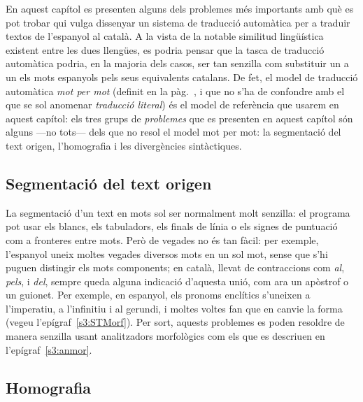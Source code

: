 En aquest capítol es presenten alguns dels problemes més importants
amb què es pot trobar qui vulga dissenyar un sistema de traducció
automàtica per a traduir textos de l'espanyol al català. A la vista de
la notable similitud lingüística existent entre les dues llengües, es
podria pensar que la tasca de traducció automàtica podria, en la
majoria dels casos, ser tan senzilla com substituir un a un els mots
espanyols pels seus equivalents catalans. De fet, el model de
traducció automàtica \emph{mot per mot} (definit en la
pàg.~\pageref{pg:mpm}, i que no s'ha de confondre amb el que se sol
anomenar \emph{traducció literal}) és el model de referència que
usarem en aquest capítol: els tres grups de {\em problemes} que es
presenten en aquest capítol són alguns ---no tots--- dels que no resol
el model mot per mot: la segmentació del text origen, l'homografia i
les divergències sintàctiques.

\subsection{Segmentació del text origen}

La segmentació d'un text en mots sol ser normalment molt senzilla: el
programa pot usar els blancs, els tabuladors, els finals de línia o
els signes de puntuació com a fronteres entre mots. Però de vegades no
és tan fàcil: per exemple, l'espanyol uneix moltes vegades diversos
mots en un sol mot, sense que s'hi puguen distingir els mots
components; en català, llevat de contraccions com \emph{al},
\emph{pels}, i \emph{del}, sempre queda alguna indicació d'aquesta
unió, com ara un apòstrof o un guionet. Per exemple, en espanyol, els
pronoms enclítics s'uneixen a l'imperatiu, a l'infinitiu i al gerundi,
i moltes voltes fan que en canvie la forma (vegeu
l'epígraf~\ref{s3:STMorf}). Per sort, aquests problemes es poden
resoldre de manera senzilla usant analitzadors morfològics com els que
es descriuen en l'epígraf~\ref{s3:anmor}.

\subsection{Homografia}

